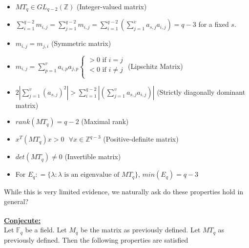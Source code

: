 \documentclass[11pt]{article}
\theoremstyle{plain}
\theoremstyle{definition}
\begin{document}
\begin{itemize}
	\item $MT_q \in GL_{q-2} (\mathbb{Z})$ (Integer-valued matrix)
	\item $\sum\limits_{i=1}^{q-2} m_{i,j} = \sum\limits_{j=1}^{q-2} m_{i,j} = \sum\limits_{i=1}^{q-2} (\sum\limits_{j=1}^{v} a_{s,j} a_{i,j} ) = q-3$ for a fixed $s$.
	\item $ m_{i,j} = m_{j,i}$ (Symmetric matrix)
	\item $
	m_{i,j} = \sum\limits_{p=1}^{v} a_{i,p} a_{j, p} 
\begin{cases}
	 > 0\text{ if }i = j \\
    < 0\text{ if }i \neq j\\
    \end{cases}
	$ (Lipschitz Matrix)
	\item $2 | \sum\limits_{j=1}^{v} ( a_{s,j} )^2 | > \sum\limits_{i=1}^{q-2} | ( \sum\limits_{j=1}^{v} a_{s,j} a_{i,j} ) |$ (Strictly diagonally dominant matrix)
	\item $ rank(MT_q) = q-2 $ (Maximal rank)
	\item $ x^T (MT_q) x > 0 \text{ } \forall x \in \mathbb{Z}^{q-3}$ (Positive-definite matrix)
	\item $det(MT_q) \neq 0 $ (Invertible matrix)
	\item For $E_q : = \{\lambda : \lambda \text{ is an eigenvalue of }MT_q \}$, $min(E_q) = q-3$
\end{itemize}
While this is very limited evidence, we naturally ask do these properties hold in general?\\
\\
\textbf{\underline{Conjecute:}} \\
Let $\mathbb{F}_q$ be a field. Let $M_q$ be the matrix as previously defined. Let $MT_q$ as previously defined. Then the following properties are satisfied
\end{document}
